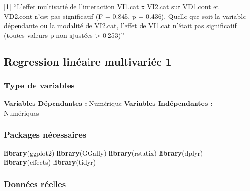 \documentclass[
]{book}
\newenvironment{Shaded}{\begin{snugshade}}{\end{snugshade}}
\newcommand{\KeywordTok}[1]{\textcolor[rgb]{0.13,0.29,0.53}{\textbf{#1}}}
\newcommand{\NormalTok}[1]{#1}
\begin{document}
{[}1{]} ``L'effet multivarié de l'interaction VI1.cat x VI2.cat sur VD1.cont et VD2.cont n'est pas significatif (F = 0.845, p = 0.436). Quelle que soit la variable dépendante ou la modalité de VI2.cat, l'effet de VI1.cat n'était pas significatif (toutes valeurs p non ajustées \textgreater{} 0.253)''

\hypertarget{regression-linuxe9aire-multivariuxe9e-1}{%
\subsection{Regression linéaire multivariée 1}\label{regression-linuxe9aire-multivariuxe9e-1}}

\hypertarget{type-de-variables-21}{%
\subsubsection{Type de variables}\label{type-de-variables-21}}

\textbf{Variables Dépendantes :} Numérique
\textbf{Variables Indépendantes :} Numériques

\hypertarget{packages-nuxe9cessaires-21}{%
\subsubsection{Packages nécessaires}\label{packages-nuxe9cessaires-21}}

\begin{Shaded}
\begin{Highlighting}[]
\KeywordTok{library}\NormalTok{(ggplot2)}
\KeywordTok{library}\NormalTok{(GGally)}
\KeywordTok{library}\NormalTok{(rstatix)}
\KeywordTok{library}\NormalTok{(dplyr)}
\KeywordTok{library}\NormalTok{(effects)}
\KeywordTok{library}\NormalTok{(tidyr)}
\end{Highlighting}
\end{Shaded}

\hypertarget{donnuxe9es-ruxe9elles-21}{%
\subsubsection{Données réelles}\label{donnuxe9es-ruxe9elles-21}}
\end{document}
